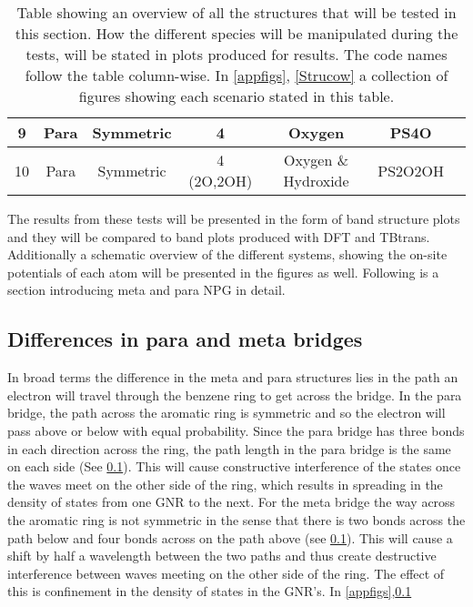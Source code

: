 \begin{table}[ht]
\begin{tabular}{|c|c|c|c|c|c|c|}
9                             & Para                           & Symmetric                                 & 4                       & Oxygen                                             & PS4O \\ \hline
10                             & Para                           & Symmetric                               & 4 (2O,2OH)                       & Oxygen \& Hydroxide                                           & PS2O2OH                        \\ \hline
\end{tabular}
\caption{Table showing an overview of all the structures that will be tested in this section.  How the different species will be manipulated during the tests, will be stated in plots produced for results. The code names follow the table column-wise. In \cref{appfigs}, \cref{Strucow} a collection of figures showing each scenario stated in this table.}
\label{testtable}
\end{table}
The results from these tests will be presented in the form of band structure plots and they will be compared to band plots produced with DFT and TBtrans. Additionally a schematic overview of the different systems, showing the on-site potentials of each atom will be presented in the figures as well. Following is a section introducing meta and para NPG in detail. 
\subsection{Differences in para and meta bridges}
In broad terms the difference in the meta and para structures lies in the path an electron will travel through the benzene ring to get across the bridge. In the para bridge, the path across the aromatic ring is symmetric and so the electron will pass above or below with equal probability. Since the para bridge has three bonds in each direction across the ring, the path length in the para bridge is the same on each side (See \cref{}). This will cause constructive interference of the states once the waves meet on the other side of the ring, which results in spreading in the density of states from one GNR to the next. For the meta bridge the way across the aromatic ring is not symmetric in the sense that there is two bonds across the path below and four bonds across on the path above (see \cref{}). This will cause a shift by half a wavelength between the two paths and thus create destructive interference between waves meeting on the other side of the ring. The effect of this is confinement in the density of states in the GNR's. In \cref{appfigs},\cref{} 
